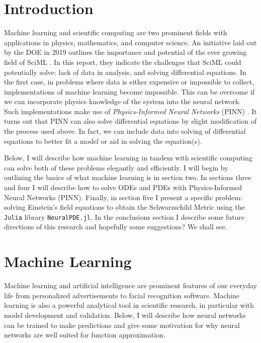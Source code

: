 \documentclass{CUP-JNL-DTM}%
\theoremstyle{definition}
\numberwithin{equation}{section}
\newcommand{\Julia}{\texttt{Julia} }
\begin{document}
\section{Introduction}

Machine learning and scientific computing are two prominent fields with applications in physics, mathematics, and computer science. An initiative laid out by the DOE in 2019 outlines the importance and potential of the ever growing field of SciML \cite{bakerWorkshopReportBasic2019}. In this report, they indicate the challenges that SciML could potentially solve: lack of data in analysis, and solving differential equations. In the first case, in problems where data is either expensive or impossible to collect, implementations of machine learning become impossible. This can be overcome if we can incorporate physics knowledge of the system into the neural network. Such implementations make use of \emph{Physics-Informed Neural Networks} (PINN) \cite{karniadakisPhysicsinformedMachineLearning2021}. It turns out that PINN can also solve differential equations by slight modification of the process used above. In fact, we can include data into solving of differential equations to better fit a model or aid in solving the equation(s). 

Below, I will describe how machine learning in tandem with scientific computing can solve both of these problems elegantly and efficiently. I will begin by outlining the basics of what machine learning is in section two. In sections three and four I will describe how to solve ODEs and PDEs with Physics-Informed Neural Networks (PINN). Finally, in section five I present a specific problem: solving Einstein's field equations to obtain the Schwarzschild Metric using the \Julia library \texttt{NeuralPDE.jl}. In the conclusions section I describe some future directions of this research and hopefully some suggestions? We shall see. 


\section{Machine Learning}

Machine learning and artificial intelligence are prominent features of our everyday life from personalized advertisements to facial recognition software. Machine learning is also a powerful analytical tool in scientific research, in particular with model development and validation. Below, I will describe how neural networks can be trained to make predictions and give some motivation for why neural networks are well suited for function approximation. 
\end{document}
